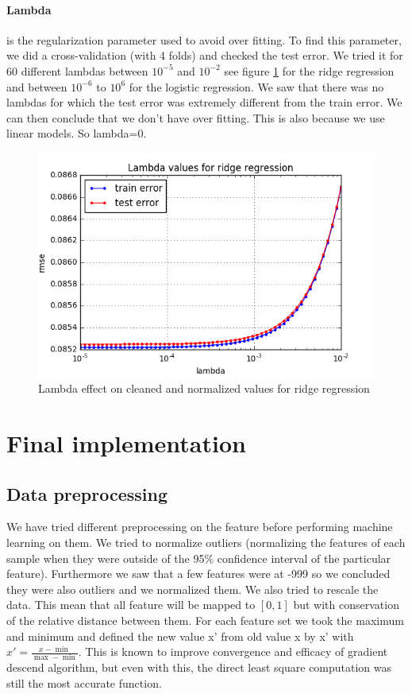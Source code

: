 \documentclass[10pt,conference,compsocconf]{IEEEtran}
\begin{document}
\paragraph{Lambda} is the regularization parameter used to avoid over fitting. To find this parameter, we did a cross-validation (with 4 folds) and checked the test error. We tried it for 60 different lambdas between $10^{-5}$ and $10^{-2}$  see figure \ref{fig1} for the ridge regression and between $10^{-6}$ to $10^6$ for the logistic regression. We saw that there was no lambdas for which the test error was extremely different from the train error. We can then conclude that we don’t have over fitting. This is also because we use linear models. So lambda=0.
\begin{figure}[tbp]
  \centering
  \includegraphics[width=\columnwidth]{Lambda values for ridge regression}
  \caption{Lambda effect on cleaned and normalized values for ridge regression}
  \vspace{-3mm}
  \label{fig1}
\end{figure}
\section{Final implementation}
\subsection{Data preprocessing} We have tried different preprocessing on the feature before performing machine learning on them. We tried to normalize outliers (normalizing the features of each sample when they were outside of the 95\% confidence interval of the particular feature). Furthermore we saw that a few features were at -999 so we concluded they were also outliers and we normalized them.
We also tried to rescale the data. This mean that all feature will be  mapped to \( [0,1] \) but with conservation of the relative distance between them. For each feature set we took the maximum and minimum and defined the new value x' from old value x by x' with $x' = \frac{x-\min}{\max - \min }$. This is known to improve convergence and efficacy of gradient descend algorithm, but even with this, the direct least square computation was still the most accurate function.
\end{document}
